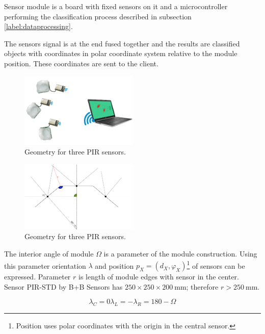 Sensor module is a board with fixed sensors on it and a microcontroller performing the
classification process described in subsection \ref{label:dataprocessing}.

The sensors signal is at the end fused together and the results are classified objects
with coordinates in polar coordinate system relative to the module position. These
coordinates are sent to the client.

\begin{figure}[h!]
\begin{center}
\includegraphics[width=0.5\textwidth]{obrazky-figures/design.png}
\caption{Geometry for three PIR sensors.\label{fig:design}}
\end{center}
\end{figure}

\begin{figure}[h!]
\begin{center}
\includegraphics[width=0.5\textwidth]{obrazky-figures/3pir_geometry.png}
\caption{Geometry for three PIR sensors.\label{fig:3pir_geometry}}
\end{center}
\end{figure}

The interior angle of module $\Omega$ is a parameter of the module construction. Using this parameter
orientation $\lambda$ and position $p_X = (d_X,\varphi _X)$\footnote{Position uses polar coordinates
with the origin in the central sensor.} of sensors can be expressed. Parameter $r$ is length
of module edges with sensor in the center. Sensor PIR-STD by B+B Sensors has $250\times 250\times 200~\text{mm}$;
therefore $r > 250~\text{mm}$.


\begin{subequations}
\begin{equation}
\lambda_C = 0
\end{equation}
\begin{equation}
\lambda_L = -\lambda_R = 180 - \Omega
\end{equation}
\end{subequations}

